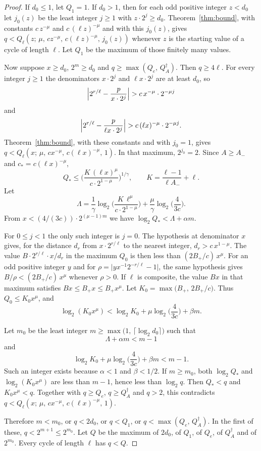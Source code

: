 \documentclass[11pt]{article}
\begin{document}
\begin{proof}
If $d_0 \le 1$, let $Q_1 = 1$.
If $d_0 > 1$, then for each odd positive integer $z < d_0$ let $j_0(z)$ be the least integer $j \ge 1$ with $z \cdot 2^j \ge d_0$.
Theorem~\ref{thm:bound}, with constants $c \, z^{-\mu}$ and $c \, (\ell z)^{-\mu}$ and with this $j_0(z)$, gives $q < Q_\ell(z;\, \mu,\, c z^{-\mu},\, c(\ell z)^{-\mu},\, j_0(z))$ whenever $z$ is the starting value of a cycle of length $\ell$.
Let $Q_1$ be the maximum of those finitely many values.

Now suppose $x \ge d_0$, $2^m \ge d_0$ and $q \ge \max(Q_e,\, Q_A^\dagger)$.
Then $q \ge 4\ell$.
For every integer $j \ge 1$ the denominators $x \cdot 2^j$ and $\ell x \cdot 2^j$ are at least $d_0$, so
\[
\Bigl| 2^{r/\ell} - \frac{p}{x \cdot 2^j} \Bigr| > c \, x^{-\mu} \cdot 2^{-\mu j}
\]
and
\[
\Bigl| 2^{r/\ell} - \frac{p}{\ell x \cdot 2^j} \Bigr| > c \, (\ell x)^{-\mu} \cdot 2^{-\mu j}.
\]
Theorem~\ref{thm:bound}, with these constants and with $j_0 = 1$, gives $q < Q_\ell(x;\, \mu,\, c x^{-\mu},\, c(\ell x)^{-\mu},\, 1)$.
In that maximum, $2^{j_0} = 2$.
Since $A \ge A_-$ and $c_* = c(\ell x)^{-\mu}$,
\[
Q_* \le \Biggl( \frac{K \, (\ell x)^{\mu}}{c \cdot 2^{1-\mu}} \Biggr)^{1/\gamma},
\qquad
K = \frac{\ell-1}{\ell A_-} + \ell.
\]
Let
\[
\Lambda = \frac1\gamma \log_2\Biggl( \frac{K \, \ell^{\mu}}{c \cdot 2^{1-\mu}} \Biggr) + \frac{\mu}{\gamma} \log_2\Biggl( \frac{4}{3c} \Biggr).
\]
From $x < (4/(3c)) \cdot 2^{(\mu-1)m}$ we have $\log_2 Q_* < \Lambda + \alpha m$.

For $0 \le j < 1$ the only such integer is $j = 0$.
The hypothesis at denominator $x$ gives, for the distance $d_r$ from $x \cdot 2^{r/\ell}$ to the nearest integer, $d_r > c \, x^{1-\mu}$.
The value $B \cdot 2^{r/\ell} \cdot x / d_r$ in the maximum $Q_0$ is then less than $(2B_+/c) \, x^{\mu}$.
For an odd positive integer $y$ and for $\rho = \lvert y x^{-1} 2^{-r/\ell} - 1 \rvert$, the same hypothesis gives $B/\rho < (2B_+/c) \, x^{\mu}$ whenever $\rho > 0$.
If $\ell$ is composite, the value $Bx$ in that maximum satisfies $Bx \le B_+ x \le B_+ x^{\mu}$.
Let $K_0 = \max\bigl(B_+,\, 2B_+/c\bigr)$.
Thus $Q_0 \le K_0 x^{\mu}$, and
\[
\log_2(K_0 x^{\mu}) < \log_2 K_0 + \mu \log_2\Biggl( \frac{4}{3c} \Biggr) + \beta m.
\]

Let $m_0$ be the least integer $m \ge \max\bigl(1,\, \lceil \log_2 d_0 \rceil\bigr)$ such that
\[
\Lambda + \alpha m < m - 1
\]
and
\[
\log_2 K_0 + \mu \log_2\Biggl( \frac{4}{3c} \Biggr) + \beta m < m - 1.
\]
Such an integer exists because $\alpha < 1$ and $\beta < 1/2$.
If $m \ge m_0$, both $\log_2 Q_*$ and $\log_2(K_0 x^{\mu})$ are less than $m - 1$, hence less than $\log_2 q$.
Then $Q_* < q$ and $K_0 x^{\mu} < q$.
Together with $q \ge Q_e$, $q \ge Q_A^\dagger$ and $q > 2$, this contradicts $q < Q_\ell(x;\, \mu,\, c x^{-\mu},\, c(\ell x)^{-\mu},\, 1)$.

Therefore $m < m_0$, or $q < 2d_0$, or $q < Q_1$, or $q < \max(Q_e,\, Q_A^\dagger)$.
In the first of these, $q < 2^{m+1} \le 2^{m_0}$.
Let $Q$ be the maximum of $2d_0$, of $Q_1$, of $Q_e$, of $Q_A^\dagger$ and of $2^{m_0}$.
Every cycle of length $\ell$ has $q < Q$.
\end{proof}
\end{document}
